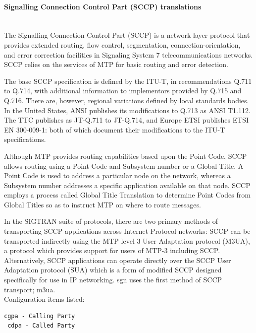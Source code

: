 \documentclass[a4paper,latin]{paper}
\begin{document}
\paragraph{Signalling Connection Control Part (SCCP) translations}
\mbox{}\\
The Signalling Connection Control Part (SCCP) is a network layer protocol that provides extended routing, flow control, segmentation, connection-orientation, 
and error correction facilities in Signaling System 7 telecommunications networks. SCCP relies on the services of MTP for basic routing and error detection.

The base SCCP specification is defined by the ITU-T, in recommendations Q.711 to Q.714, with additional information to implementors provided by Q.715 and Q.716. 
There are, however, regional variations defined by local standards bodies. In the United States, ANSI publishes its modifications to Q.713 as ANSI T1.112. 
The TTC publishes as JT-Q.711 to JT-Q.714, and Europe ETSI publishes ETSI EN 300-009-1: both of which document their modifications to the ITU-T specifications.

Although MTP provides routing capabilities based upon the Point Code, SCCP allows routing using a Point Code and Subsystem number or a Global Title.
A Point Code is used to address a particular node on the network, whereas a Subsystem number addresses a specific application available on that node. SCCP employs 
a process called Global Title Translation to determine Point Codes from Global Titles so as to instruct MTP on where to route messages.

In the SIGTRAN suite of protocols, there are two primary methods of transporting SCCP applications across Internet Protocol networks: SCCP can be transported 
indirectly using the MTP level 3 User Adaptation protocol (M3UA), a protocol which provides support for users of MTP-3 including SCCP. Alternatively, SCCP applications 
can operate directly over the SCCP User Adaptation protocol (SUA) which is a form of modified SCCP designed specifically for use in IP networking.
\acrfull{sgn} uses the first method of SCCP transport; \acrfull{m3ua}.\\

\noindent{}Configuration items listed:
\begin{lstlisting}[style=BashInputStyle, belowskip=\baselineskip]
 cgpa - Calling Party
 cdpa - Called Party
\end{lstlisting}
\end{document}
